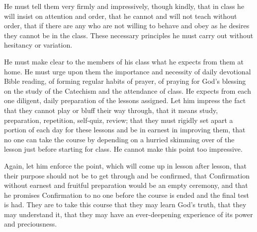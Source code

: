He must tell them very firmly and impressively, though kindly, that in class he will insist on attention and order, that he cannot and will not teach without order, that if there are any who are not willing to behave and obey as he desires they cannot be in the class. These necessary principles he must carry out without hesitancy or variation.

He must make clear to the members of his class
what he expects from them at home. He must urge upon them the importance and necessity of daily devotional Bible reading, of forming regular habits of prayer, of praying for God’s blessing on the study of the Catechism and the attendance of class. He expects from each one diligent, daily preparation of the lessons assigned. Let him impress the fact that they cannot play or bluff their way through, that it means study, preparation, repetition, self-quiz, review; that they must rigidly set apart a portion of each day for these lessons and be in earnest in improving them, that no one can take the course by depending on a hurried skimming over of the lesson just before starting for class. He cannot make this point too impressive.

Again, let him enforce the point, which will come up in lesson after lesson, that their purpose should not be to get through and be confirmed, that Confirmation without earnest and fruitful preparation would be an empty ceremony, and that he promises Confirmation to no one before the course is ended and the final test is had. They are to take this course that they may learn God’s truth, that they may understand it, that they may have an ever-deepening experience of its power and preciousness.

